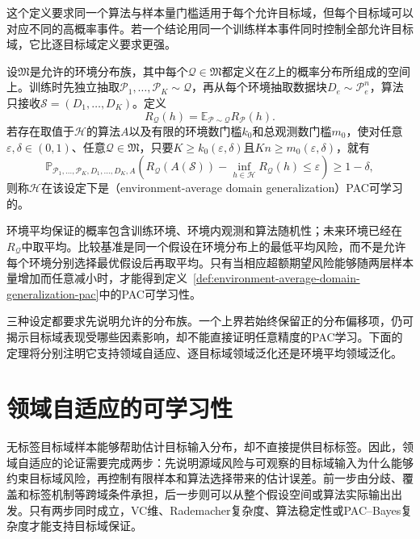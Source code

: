 这个定义要求同一个算法与样本量门槛适用于每个允许目标域，但每个目标域可以对应不同的高概率事件。若一个结论用同一个训练样本事件同时控制全部允许目标域，它比逐目标域定义要求更强。

\begin{definition}[环境平均领域泛化PAC可学习性]
\label{def:environment-average-domain-generalization-pac}
设$\mathfrak M$是允许的环境分布族，其中每个$\mathcal Q\in\mathfrak M$都定义在$Z$上的概率分布所组成的空间上。训练时先独立抽取$\mathcal P_1,\ldots,\mathcal P_K\sim\mathcal Q$，再从每个环境抽取数据块$D_e\sim\mathcal P_e^n$，算法只接收$\mathcal S=(D_1,\ldots,D_K)$。定义
\[
 R_{\mathcal Q}(h)=\mathbb E_{\mathcal P\sim\mathcal Q}R_{\mathcal P}(h).
\]
若存在取值于$\mathcal H$的算法$A$以及有限的环境数门槛$k_0$和总观测数门槛$m_0$，使对任意$\varepsilon,\delta\in(0,1)$、任意$\mathcal Q\in\mathfrak M$，只要$K\geq k_0(\varepsilon,\delta)$且$Kn\geq m_0(\varepsilon,\delta)$，就有
\[
 \mathbb P_{\mathcal P_1,\ldots,\mathcal P_K,D_1,\ldots,D_K,A}\!\left(
 R_{\mathcal Q}(A(\mathcal S))-\inf_{h\in\mathcal H}R_{\mathcal Q}(h)
 \leq\varepsilon
 \right)\geq1-\delta,
\]
则称$\mathcal H$在该设定下是（environment-average domain generalization）PAC可学习的。
\end{definition}

环境平均保证的概率包含训练环境、环境内观测和算法随机性；未来环境已经在$R_{\mathcal Q}$中取平均。比较基准是同一个假设在环境分布上的最低平均风险，而不是允许每个环境分别选择最优假设后再取平均。只有当相应超额期望风险能够随两层样本量增加而任意减小时，才能得到定义~\ref{def:environment-average-domain-generalization-pac}中的PAC可学习性。

三种设定都要求先说明允许的分布族。一个上界若始终保留正的分布偏移项，仍可揭示目标域表现受哪些因素影响，却不能直接证明任意精度的PAC学习。下面的定理将分别注明它支持领域自适应、逐目标域领域泛化还是环境平均领域泛化。

\section{领域自适应的可学习性}
\label{sec:domain-adaptation}

无标签目标域样本能够帮助估计目标输入分布，却不直接提供目标标签。因此，领域自适应的论证需要完成两步：先说明源域风险与可观察的目标域输入为什么能够约束目标域风险，再控制有限样本和算法选择带来的估计误差。前一步由分歧、覆盖和标签机制等跨域条件承担，后一步则可以从整个假设空间或算法实际输出出发。只有两步同时成立，VC维、Rademacher复杂度、算法稳定性或PAC--Bayes复杂度才能支持目标域保证。

